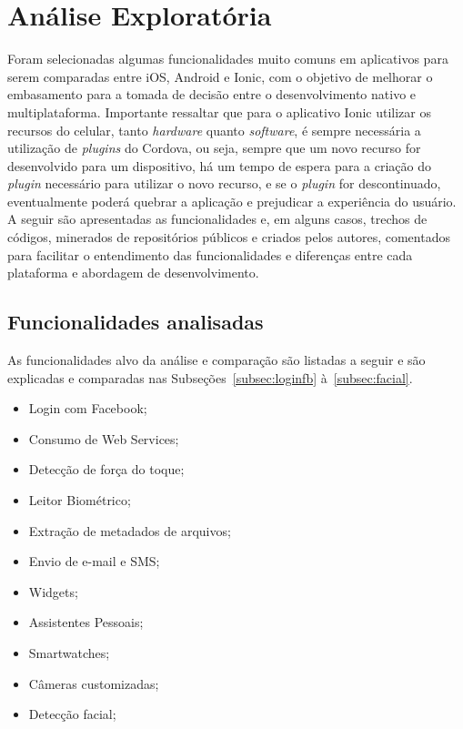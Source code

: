 \chapter{Análise Exploratória} \label{cap:analise_exploratoria}


Foram selecionadas algumas funcionalidades muito comuns em aplicativos para serem comparadas entre iOS, Android e Ionic, com o objetivo de melhorar o embasamento para a tomada de decisão entre o desenvolvimento 
nativo e multiplataforma. Importante ressaltar que para o aplicativo Ionic utilizar os recursos do celular, tanto \textit{hardware} quanto \textit{software}, é sempre necessária a utilização de 
\textit{plugins} do Cordova, ou seja, sempre que um novo recurso for desenvolvido para um dispositivo, há um tempo de espera para a criação do \textit{plugin} necessário para utilizar o novo recurso, 
e se o \textit{plugin} for descontinuado, eventualmente poderá quebrar a aplicação e prejudicar a experiência do usuário. A seguir são apresentadas as funcionalidades e, em alguns casos, trechos de códigos, minerados 
de repositórios públicos e criados pelos autores, comentados para facilitar o entendimento das funcionalidades e diferenças entre cada plataforma e abordagem de desenvolvimento. 

\section{Funcionalidades analisadas}\label{sec:intro_analise_exp}

As funcionalidades alvo da análise e comparação são listadas a seguir e são explicadas e comparadas nas Subseções~\ref{subsec:loginfb} à~\ref{subsec:facial}. 

\begin{itemize}
	\item Login com Facebook;
	\item Consumo de Web Services;
	\item Detecção de força do toque;
	\item Leitor Biométrico;
	\item Extração de metadados de arquivos;
	\item Envio de e-mail e SMS;
	\item Widgets;
	\item Assistentes Pessoais;
	\item Smartwatches;
	\item Câmeras customizadas;
	\item Detecção facial;
\end{itemize}

